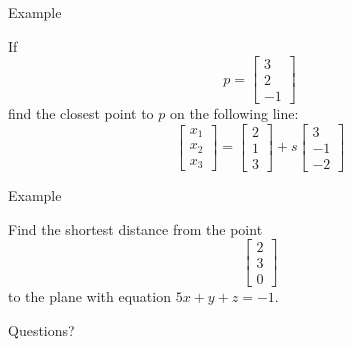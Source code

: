 \documentclass{beamer}
\begin{document}
\begin{frame}{Example}
    \begin{example}
    If
    \begin{equation*}
      p= \left[
	\begin{array}{c}
          3\\
          2\\
          -1
	\end{array}
      \right]
    \end{equation*}
    find the closest point to $p$ on the following line:
    \begin{equation*}
      \left[
	\begin{array}{c}
          x_1\\
          x_2\\
          x_3
	\end{array}
      \right] = \left[
	\begin{array}{c}
          2\\
          1\\
          3
	\end{array}
      \right]+s \left[
	\begin{array}{c}
          3\\
          -1\\
          -2
	\end{array}
      \right]
    \end{equation*}
  \end{example}
\end{frame}

\begin{frame}{Example}
    \begin{example}
    Find the shortest distance from the point
    \begin{equation*}
      \left[
	\begin{array}{c}
          2\\
          3\\
          0
	\end{array}
      \right]
    \end{equation*}
    to the plane with equation $5x+y+z = -1$.
  \end{example}
\end{frame}

\begin{frame}
  Questions?
\end{frame}
\end{document}
